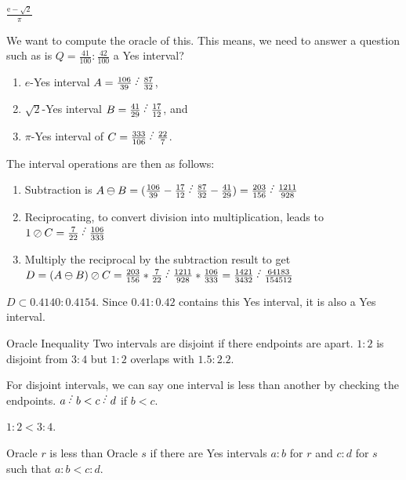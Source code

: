 \documentclass{beamer}
\begin{document}
\begin{frame}{$\frac{\mathrm{e} - \sqrt{2}}{\pi}$}

    We want to compute the oracle of this. This means, we need to answer a question such as is $Q = \frac{41}{100}: \frac{42}{100}$ a Yes interval?

\begin{enumerate}
\item $e$-Yes interval $A  = \frac{106}{39} \lte \frac{87}{32}$,
\item $\sqrt{2}$-Yes interval $B = \frac{41}{29} \lte \frac{17}{12}$, and
\item $\pi$-Yes interval of $C= \frac{333}{106} \lte \frac{22}{7}$.
\end{enumerate}
The interval operations are then as follows:
\begin{enumerate}
\item Subtraction is $A\ominus B = (\frac{106}{39} - \frac{17}{12} \lte \frac{87}{32} - \frac{41}{29}) = \frac{203}{156} \lte \frac{1211}{928}$ 
\item Reciprocating, to convert division into multiplication, leads to  $1\oslash C = \frac{7}{22} \lte \frac{106}{333}$
\item Multiply the reciprocal by the subtraction result to get $D = (A\ominus B)\oslash C = \frac{203}{156} *\frac{7}{22} \lte \frac{1211}{928} * \frac{106}{333} = \frac{1421}{3432} \lte \frac{64183}{154512}$
\end{enumerate}

$D \subset 0.4140: 0.4154$. Since $0.41:0.42$ contains this Yes interval, it is also a Yes interval.  
    
\end{frame}


\begin{frame}{Oracle Inequality}
    Two intervals are disjoint if there endpoints are apart.  $1:2$ is disjoint from $3:4$ but $1:2$ overlaps with $1.5:2.2$.

    For disjoint intervals, we can say one interval is less than another by checking the endpoints. $a\lte b < c \lte d$ if $b<c$.

    $1:2 < 3:4$.

    Oracle $r$ is less than Oracle $s$ if there are Yes intervals $a:b$ for $r$ and $c:d$ for $s$ such that $a:b < c:d$.

\end{frame}
\end{document}
